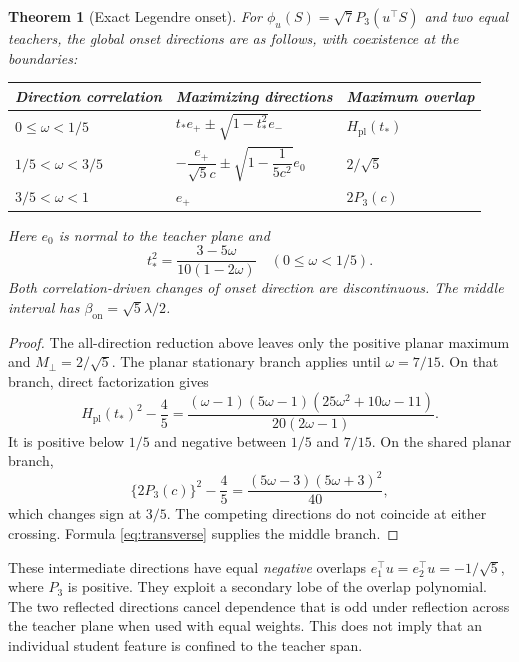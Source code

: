 \documentclass[11pt]{article}
\newcommand{\on}{\mathrm{on}}
\newtheorem{theorem}{Theorem}[section]
\theoremstyle{remark}
\begin{document}
\begin{theorem}[Exact Legendre onset]\label{thm:legendre}
For $\phi_u(S)=\sqrt7 P_3(u^\top S)$ and two equal teachers,
the global onset directions are as follows, with coexistence at the boundaries:
\begin{center}
\begin{tabular}{@{}lll@{}}
\toprule
Direction correlation & Maximizing directions & Maximum overlap\\
\midrule
$0\leq\omega<1/5$ & $t_*e_+\pm\sqrt{1-t_*^2}e_-$ & $H_{\mathrm{pl}}(t_*)$\\
$1/5<\omega<3/5$ & $-\dfrac{e_+}{\sqrt5c}\pm
 \sqrt{1-\dfrac1{5c^2}}e_0$ & $2/\sqrt5$\\[5pt]
$3/5<\omega<1$ & $e_+$ & $2P_3(c)$\\
\bottomrule
\end{tabular}
\end{center}
Here $e_0$ is normal to the teacher plane and
\begin{equation}
 t_*^2=\frac{3-5\omega}{10(1-2\omega)}
 \quad(0\leq\omega<1/5).
\end{equation}
Both correlation-driven changes of onset direction are discontinuous.
The middle interval has $\beta_\on=\sqrt5\lambda/2$.
\end{theorem}
\begin{proof}
The all-direction reduction above leaves only the positive planar
maximum and $M_\perp=2/\sqrt5$. The planar stationary branch applies
until $\omega=7/15$. On that branch, direct factorization gives
\begin{equation}
 H_{\mathrm{pl}}(t_*)^2-\frac45
 =\frac{(\omega-1)(5\omega-1)(25\omega^2+10\omega-11)}
 {20(2\omega-1)}.
\end{equation}
It is positive below $1/5$ and negative between $1/5$ and $7/15$.
On the shared planar branch,
\begin{equation}
 \{2P_3(c)\}^2-\frac45
 =\frac{(5\omega-3)(5\omega+3)^2}{40},
\end{equation}
which changes sign at $3/5$. The competing directions do not coincide
at either crossing. Formula \eqref{eq:transverse} supplies the middle branch.
\end{proof}

These intermediate directions have equal \emph{negative} overlaps
$e_1^\top u=e_2^\top u=-1/\sqrt5$, where $P_3$ is positive.
They exploit a secondary lobe of the overlap polynomial. The two reflected
directions cancel dependence that is odd under reflection across the teacher
plane when used with equal weights. This does not imply that an individual
student feature is confined to the teacher span.
\end{document}
